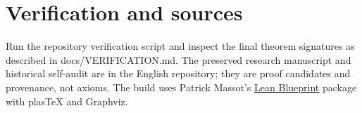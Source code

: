 \section*{Verification and sources}
Run the repository verification script and inspect the final theorem signatures as described in docs/VERIFICATION.md. The preserved research manuscript and historical self-audit are in the English repository; they are proof candidates and provenance, not axioms. The build uses Patrick Massot's \href{https://github.com/PatrickMassot/leanblueprint}{Lean Blueprint} package with plasTeX and Graphviz.



